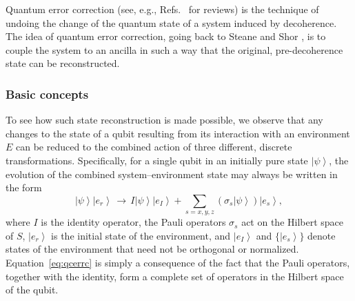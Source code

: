 \documentclass[3p,sort&compress]{elsarticle}
\newcommand{\ket}[1]{\left\vert{#1}\right\rangle}
\newcommand{\op}[1]{#1}
\begin{document}
Quantum error correction (see, e.g., Refs.~\cite{Steane:2001:dx,Knill:2002:rx,Nielsen:2000:tt,Gaitan:2008:uu,Lidar:2013:pp} for reviews) is the technique of undoing the change of the quantum state of a system induced by decoherence. The idea of quantum error correction, going back to Steane \cite{Steane:1996:cd} and Shor \cite{Shor:1995:rx}, is to couple the system to an ancilla in such a way that the original, pre-decoherence state can be reconstructed.

\subsubsection{Basic concepts}

To see how such state reconstruction is made possible, we observe that any changes to the state of a qubit resulting from its interaction with an environment $E$ can be reduced to the combined action of three different, discrete transformations. Specifically, for a single qubit in an initially pure state $\ket{\psi}$, the evolution of the combined system--environment state may always be written in the form \cite{Steane:2001:dx,Knill:2002:rx,Nielsen:2000:tt,Schlosshauer:2007:un}
%
\begin{equation} \label{eq:qcerrc} 
\ket{\psi} \ket{e_r}  \, \longrightarrow \, I
  \ket{\psi} \ket{e_I} + \sum_{s= x,y,z }
  \left( \sigma_s \ket{\psi} \right)
  \ket{e_s},
\end{equation}
%
where $\op{I}$ is the identity operator, the Pauli operators $\sigma_s$ act on the Hilbert space of $S$, $\ket{e_r}$ is the initial state of the environment, and $\ket{e_I}$ and $\{ \ket{e_s} \}$ denote states of the environment that need not be orthogonal or normalized. Equation~\eqref{eq:qcerrc} is simply a consequence of the fact that the Pauli operators, together with the identity, form a complete set of operators in the Hilbert space of the qubit. 
\end{document}
